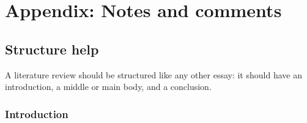 \documentclass[12pt]{llncs}
\begin{document}
\begin{comment}
However, to the best of our knowledge, the more flexible wavelet transform is hardly ever used as the representation domain for a convolutional neural network. As a result, in the following section we present our methodology, which leverages the benefits of the wavelet transform demonstrated in the signal processing literature, as well as the ability to form hierarchical feature representations for deep learning.





\end{comment}


\section{Appendix: Notes and comments}
\subsection*{Structure help}
A literature review should be structured like any other essay: it should have an introduction, a middle or main body, and a conclusion.

\subsubsection*{Introduction}
\end{document}
